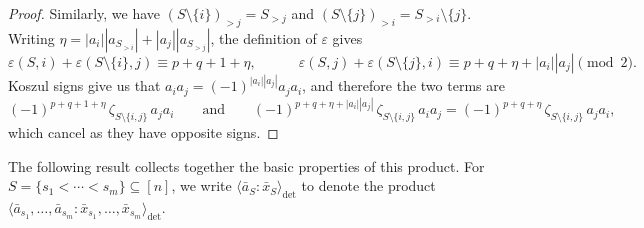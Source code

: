 \documentclass[11pt]{article}
\theoremstyle{definition}
\theoremstyle{definition}
\begin{document}
\begin{proof}
Similarly, we have $(S\setminus\{i\})_{>j}=S_{>j}$ and $(S\setminus\{j\})_{>i}=S_{>i}\setminus\{j\}$.
Writing $\eta=|a_i||a_{S_{>i}}|+|a_j||a_{S_{>j}}|$, the definition of $\varepsilon$ gives
\begin{equation*}
\varepsilon(S,i)+\varepsilon(S\setminus\{i\},j)\equiv p+q+1+\eta,
\qquad\quad
\varepsilon(S,j)+\varepsilon(S\setminus\{j\},i)\equiv p+q+\eta+|a_i||a_j| \pmod 2.
\end{equation*}
Koszul signs give us that $a_ia_j=(-1)^{|a_i||a_j|}a_ja_i$, and therefore the two terms are
\begin{equation*}
(-1)^{p+q+1+\eta}\,\zeta_{S\setminus\{i,j\}}\,a_ja_i
\qquad\text{and}\qquad
(-1)^{p+q+\eta+|a_i||a_j|}\,\zeta_{S\setminus\{i,j\}}\,a_ia_j=(-1)^{p+q+\eta}\,\zeta_{S\setminus\{i,j\}}\,a_ja_i,
\end{equation*}
which cancel as they have opposite signs.
\end{proof}



The following result collects together the basic properties of this product. For $S= \{s_1<\cdots<s_m\}\subseteq[n]$, we write
$\langle \bar a_{S}:\bar x_{S}\rangle_{\det}$ to denote the product $\langle \bar a_{s_1},\ldots,\bar a_{s_m} 
: \bar x_{s_1},\ldots,\bar x_{s_m}\rangle_{\det}$.
\end{document}
